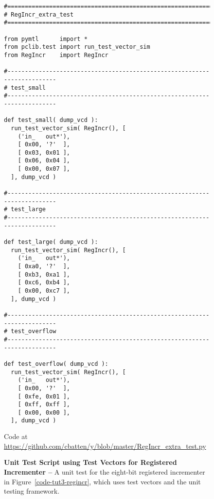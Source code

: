 
\begin{figure}

  \begin{lstlisting}[xleftmargin={0.9in}]
#=========================================================================
# RegIncr_extra_test
#=========================================================================

from pymtl      import *
from pclib.test import run_test_vector_sim
from RegIncr    import RegIncr

#-------------------------------------------------------------------------
# test_small
#-------------------------------------------------------------------------

def test_small( dump_vcd ):
  run_test_vector_sim( RegIncr(), [
    ('in_   out*'),
    [ 0x00, '?'  ],
    [ 0x03, 0x01 ],
    [ 0x06, 0x04 ],
    [ 0x00, 0x07 ],
  ], dump_vcd )

#-------------------------------------------------------------------------
# test_large
#-------------------------------------------------------------------------

def test_large( dump_vcd ):
  run_test_vector_sim( RegIncr(), [
    ('in_   out*'),
    [ 0xa0, '?'  ],
    [ 0xb3, 0xa1 ],
    [ 0xc6, 0xb4 ],
    [ 0x00, 0xc7 ],
  ], dump_vcd )

#-------------------------------------------------------------------------
# test_overflow
#-------------------------------------------------------------------------

def test_overflow( dump_vcd ):
  run_test_vector_sim( RegIncr(), [
    ('in_   out*'),
    [ 0x00, '?'  ],
    [ 0xfe, 0x01 ],
    [ 0xff, 0xff ],
    [ 0x00, 0x00 ],
  ], dump_vcd )
\end{lstlisting}

  \centerline{\small Code at
    \url{https://github.com/cbatten/y/blob/master/RegIncr_extra_test.py}}

  \caption{\textbf{Unit Test Script using Test Vectors for Registered
      Incrementer --} A unit test for the eight-bit registered
    incrementer in Figure~\ref{code-tut3-regincr}, which uses test
    vectors and the  unit testing framework.}
  \label{code-tut3-regincr-extra-test}

\end{figure}


